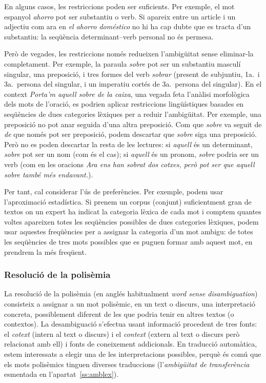 En alguns casos, les restriccions poden ser suficients. Per exemple,
el mot espanyol \emph{ahorro} pot ser substantiu o verb. Si apareix
entre un article i un adjectiu com ara en \emph{el ahorro doméstico}
no hi ha cap dubte que es tracta d'un substantiu: la seqüència
determinant--verb personal no és permesa.

Però de vegades, les restriccions només redueixen l'ambigüitat sense
eliminar-la completament.  Per exemple, la paraula \emph{sobre} pot
ser un substantiu masculí singular, una preposició, i tres formes del
verb \emph{sobrar} (present de subjuntiu, 1a.\ i 3a.\ persona del
singular, i un imperatiu cortés de 3a.\ persona del singular). En el
context \emph{Porta'm aquell sobre de la caixa}, una vegada feta
l'anàlisi morfològica dels mots de l'oració, es podrien aplicar
restriccions lingüístiques basades en seqüències de dues categories
lèxiques per a reduir l'ambigüitat. Per exemple, una preposició no pot
anar seguida d'una altra preposició. Com que \emph{sobre} va seguit de
\emph{de} que només pot ser preposició, podem descartar que
\emph{sobre} siga una preposició. Però no es poden descartar la resta
de les lectures: si \emph{aquell} és un determinant, \emph{sobre} pot
ser un nom (com és el cas); si \emph{aquell} és un pronom,
\emph{sobre} podria ser un verb (com en les oracions \emph{Ara ens han
  sobrat dos cotxes, però pot ser que aquell sobre també més
  endavant.}). 

Per tant, cal considerar l'ús de preferències. Per exemple, podem usar
l'aproximació estadística.  Si prenem un corpus (conjunt)
suficientment gran de textos on un expert ha indicat la categoria
lèxica de cada mot i comptem quantes voltes apareixen totes les
seqüències possibles de dues categories lèxiques, podem usar aquestes
freqüències per a assignar la categoria d'un mot ambigu: de totes les
seqüències de tres mots possibles que es puguen formar amb aquest mot,
en prendrem la més freqüent.


\subsubsection{Resolució de la polisèmia}


 La resolució de la polisèmia (en anglés habitualment \emph{word sense
   disambiguation}) consisteix a assignar a un mot polisèmic, en un
 text o discurs, una interpretació concreta, possiblement diferent de
 les que podria tenir en altres textos (o contextos). La desambiguació
 s'efectua usant informació procedent de tres fonts: el \emph{cotext}
 (intern al text o discurs) i el \emph{context} (extern al text o
 discurs però relacionat amb ell) i fonts de coneixement addicionals.
 En traducció automàtica, estem interessats a elegir una de les
 interpretacions possibles, perquè és comú que els mots polisèmics
 tinguen diverses traduccions (l'\emph{ambigüitat de transferència}
 esmentada en l'apartat~\ref{ss:amblex}).

